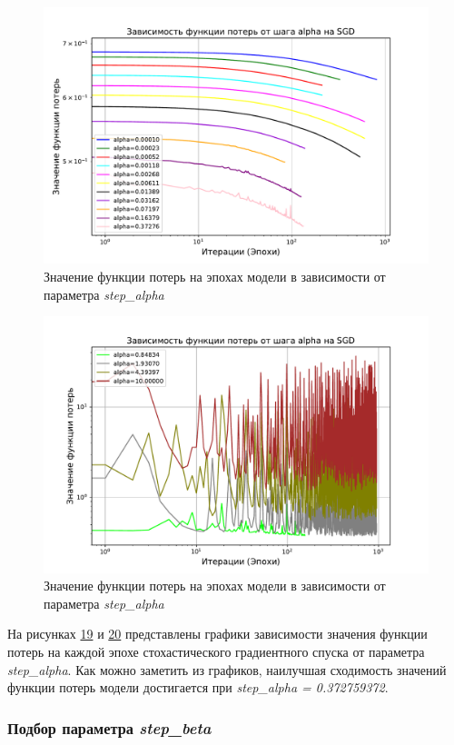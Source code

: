 \documentclass[14pt]{extarticle}
\begin{document}
\begin{figure}[H]
    \centering
    \includegraphics[width=0.7\linewidth]
    {exp_5_loss_alpha_1.pdf}
    \caption{Значение функции потерь на эпохах модели в зависимости от параметра \textit{step\_alpha}}
    \label{fig:exp_5_loss_alpha_1}
\end{figure}

\begin{figure}[H]
    \centering
    \includegraphics[width=0.7\linewidth]
    {exp_5_loss_alpha_2.pdf}
    \caption{Значение функции потерь на эпохах модели в зависимости от параметра \textit{step\_alpha}}
    \label{fig:exp_5_loss_alpha_2}
\end{figure}

На рисунках \hyperref[fig:exp_5_loss_alpha_1]{19} и \hyperref[fig:exp_5_loss_alpha_2]{20} представлены графики зависимости значения функции потерь на каждой эпохе стохастического градиентного спуска от параметра \textit{step\_alpha}. Как можно заметить из графиков, наилучшая сходимость значений функции потерь модели достигается при \textit{step\_alpha = 0.372759372}.

\subsubsection{Подбор параметра \textit{step\_beta}}
\end{document}
